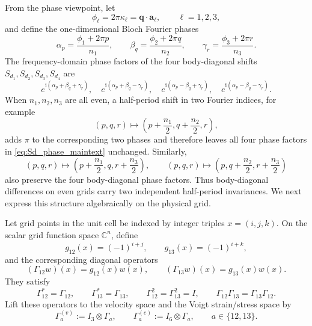 \documentclass[11pt,oneside]{article}
\numberwithin{equation}{section}
\theoremstyle{plain}
\theoremstyle{remark}
\newcommand{\bq}{\bm{q}}
\newcommand{\ba}[1]{\bm{a}_{#1}}
\begin{document}
From the phase viewpoint, let
\[
\phi_\ell=2\pi\kappa_\ell=\bq\cdot\ba{\ell},\qquad \ell=1,2,3,
\]
and define the one-dimensional Bloch Fourier phases
\[
\alpha_p=\frac{\phi_1+2\pi p}{n_1},\qquad
\beta_q=\frac{\phi_2+2\pi q}{n_2},\qquad
\gamma_r=\frac{\phi_3+2\pi r}{n_3}.
\]
The frequency-domain phase factors of the four body-diagonal shifts \(S_{d_1},S_{d_2},S_{d_3},S_{d_4}\) are
\begin{equation}\label{eq:Sd_phase_maintext}
e^{\mathrm i(\alpha_p+\beta_q+\gamma_r)},\quad
e^{\mathrm i(\alpha_p+\beta_q-\gamma_r)},\quad
e^{\mathrm i(\alpha_p-\beta_q+\gamma_r)},\quad
e^{\mathrm i(\alpha_p-\beta_q-\gamma_r)}.
\end{equation}
When \(n_1,n_2,n_3\) are all even, a half-period shift in two Fourier indices, for example
\[
(p,q,r)\mapsto\left(p+\frac{n_1}{2},q+\frac{n_2}{2},r\right),
\]
adds \(\pi\) to the corresponding two phases and therefore leaves all four phase factors in \eqref{eq:Sd_phase_maintext} unchanged. Similarly,
\[
(p,q,r)\mapsto\left(p+\frac{n_1}{2},q,r+\frac{n_3}{2}\right),
\qquad
(p,q,r)\mapsto\left(p,q+\frac{n_2}{2},r+\frac{n_3}{2}\right)
\]
also preserve the four body-diagonal phase factors. Thus body-diagonal differences on even grids carry two independent half-period invariances. We next express this structure algebraically on the physical grid.

Let grid points in the unit cell be indexed by integer triples \(x=(i,j,k)\). On the scalar grid function space \(\mathbb C^n\), define
\begin{equation}\label{eq:Gamma12_13_sign_main}
g_{12}(x)=(-1)^{i+j},
\qquad
g_{13}(x)=(-1)^{i+k},
\end{equation}
and the corresponding diagonal operators
\begin{equation}\label{eq:Gamma12_13_op_main}
(\Gamma_{12}w)(x)=g_{12}(x)w(x),
\qquad
(\Gamma_{13}w)(x)=g_{13}(x)w(x).
\end{equation}
They satisfy
\begin{equation}\label{eq:Gamma_basic_main}
\Gamma_{12}^*=\Gamma_{12},\qquad
\Gamma_{13}^*=\Gamma_{13},\qquad
\Gamma_{12}^2=\Gamma_{13}^2=I,
\qquad
\Gamma_{12}\Gamma_{13}=\Gamma_{13}\Gamma_{12}.
\end{equation}
Lift these operators to the velocity space and the Voigt strain/stress space by
\begin{equation}\label{eq:Gamma_lift_main}
\Gamma_a^{(v)}:=I_3\otimes\Gamma_a,
\qquad
\Gamma_a^{(e)}:=I_6\otimes\Gamma_a,
\qquad a\in\{12,13\}.
\end{equation}
\end{document}
